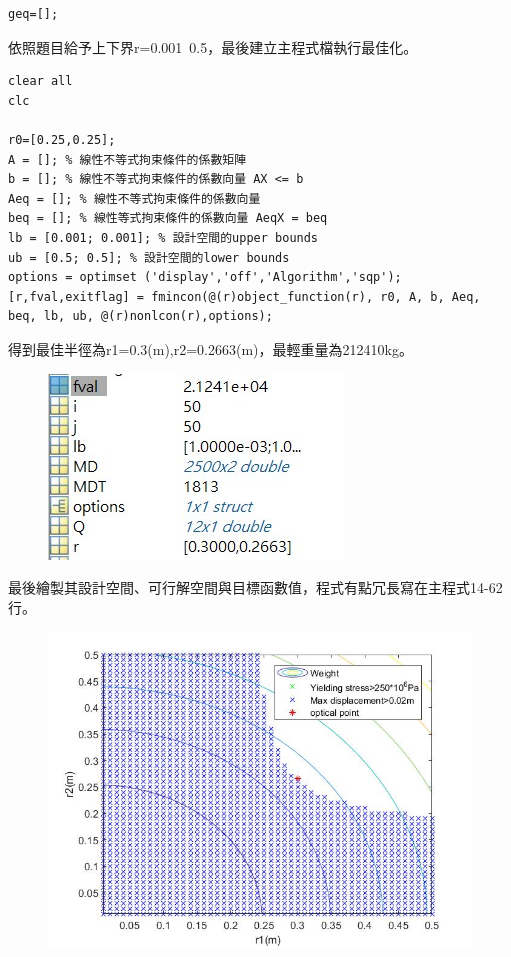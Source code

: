 \documentclass[12pt]{article}
\begin{document}
\begin{CJK}{UTF8}{bkai}
\begin{lstlisting}
geq=[];
\end{lstlisting}

依照題目給予上下界r=0.001~0.5，最後建立主程式檔執行最佳化。

\begin{lstlisting}
clear all
clc

r0=[0.25,0.25];
A = []; % 線性不等式拘束條件的係數矩陣
b = []; % 線性不等式拘束條件的係數向量 AX <= b
Aeq = []; % 線性不等式拘束條件的係數向量
beq = []; % 線性等式拘束條件的係數向量 AeqX = beq
lb = [0.001; 0.001]; % 設計空間的upper bounds
ub = [0.5; 0.5]; % 設計空間的lower bounds
options = optimset ('display','off','Algorithm','sqp');
[r,fval,exitflag] = fmincon(@(r)object_function(r), r0, A, b, Aeq, beq, lb, ub, @(r)nonlcon(r),options);
\end{lstlisting}

得到最佳半徑為r1=0.3(m),r2=0.2663(m)，最輕重量為212410kg。\\


\begin{figure}[h]
\includegraphics[scale=1]{./graph/result.jpg}
\end{figure}



最後繪製其設計空間、可行解空間與目標函數值，程式有點冗長寫在主程式14-62行。
\begin{figure}[h]
\includegraphics[scale=0.5]{./graph/space.jpg}
\end{figure}

\clearpage



\end{CJK}
\end{document}
